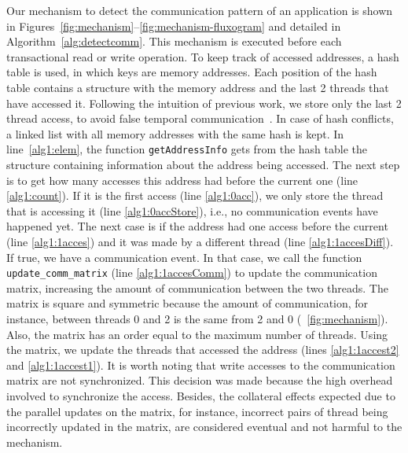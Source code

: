 Our mechanism to detect the communication pattern of an application is shown in Figures~\ref{fig:mechanism}--\ref{fig:mechanism-fluxogram} and detailed in Algorithm~\ref{alg:detectcomm}. This mechanism is executed before each transactional read or write operation. To keep track of accessed addresses, a hash table is used, in which keys are memory addresses. Each position of the hash table contains a structure with the memory address and the last 2 threads that have accessed it. Following the intuition of previous work, we store only the last 2 thread access, to avoid false temporal communication~\cite{Diener:2016:2}. In case of hash conflicts, a linked list with all memory addresses with the same hash is kept. In line~\ref{alg1:elem}, the function \texttt{getAddressInfo} gets from the hash table the structure containing information about the address being accessed. The next step is to get how many accesses this address had before the current one (line \ref{alg1:count}). If it is the first access (line \ref{alg1:0acc}), we only store the thread that is accessing it (line \ref{alg1:0accStore}), i.e., no communication events have happened yet. The next case is if the address had one access before the current (line \ref{alg1:1acces}) and it was made by a different thread (line \ref{alg1:1accesDiff}). If true, we have a communication event. In that case, we call the function \texttt{update\_comm\_matrix} (line \ref{alg1:1accesComm}) to update the communication matrix, increasing the amount of communication between the two threads. The matrix is square and symmetric because the amount of communication, for instance, between threads 0 and 2 is the same from 2 and 0 (\figurename~\ref{fig:mechanism}). Also, the matrix has an order equal to the maximum number of threads. Using the matrix, we update the threads that accessed the address (lines \ref{alg1:1accest2} and \ref{alg1:1accest1}). It is worth noting that write accesses to the communication matrix are not synchronized. This decision was made because the high overhead involved to synchronize the access. Besides, the collateral effects expected due to the parallel updates on the matrix, for instance, incorrect pairs of thread being incorrectly updated in the matrix, are considered eventual and not harmful to the mechanism.

